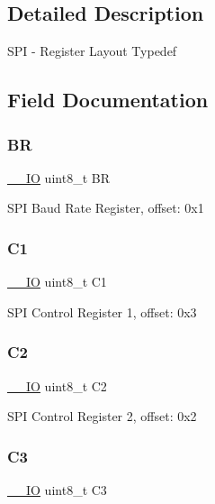 \subsection{Detailed Description}
S\+PI -\/ Register Layout Typedef 

\subsection{Field Documentation}
\mbox{\label{struct_s_p_i___type_a5bfe1e18e59f29dbbec3aca61ab9e4a8}} 
\subsubsection{\texorpdfstring{BR}{BR}}
{\footnotesize\ttfamily \mbox{\hyperlink{core__cm0plus_8h_aec43007d9998a0a0e01faede4133d6be}{\+\_\+\+\_\+\+IO}} uint8\+\_\+t BR}

S\+PI Baud Rate Register, offset\+: 0x1 \mbox{\label{struct_s_p_i___type_ad54aa92be9fc988e74d55d2d3daae8ad}} 
\subsubsection{\texorpdfstring{C1}{C1}}
{\footnotesize\ttfamily \mbox{\hyperlink{core__cm0plus_8h_aec43007d9998a0a0e01faede4133d6be}{\+\_\+\+\_\+\+IO}} uint8\+\_\+t C1}

S\+PI Control Register 1, offset\+: 0x3 \mbox{\label{struct_s_p_i___type_a4f920936a8fc32483b3ebd9b0674b450}} 
\subsubsection{\texorpdfstring{C2}{C2}}
{\footnotesize\ttfamily \mbox{\hyperlink{core__cm0plus_8h_aec43007d9998a0a0e01faede4133d6be}{\+\_\+\+\_\+\+IO}} uint8\+\_\+t C2}

S\+PI Control Register 2, offset\+: 0x2 \mbox{\label{struct_s_p_i___type_a6533a725e5ee4892879f0b6d9dd6675a}} 
\subsubsection{\texorpdfstring{C3}{C3}}
{\footnotesize\ttfamily \mbox{\hyperlink{core__cm0plus_8h_aec43007d9998a0a0e01faede4133d6be}{\+\_\+\+\_\+\+IO}} uint8\+\_\+t C3}

